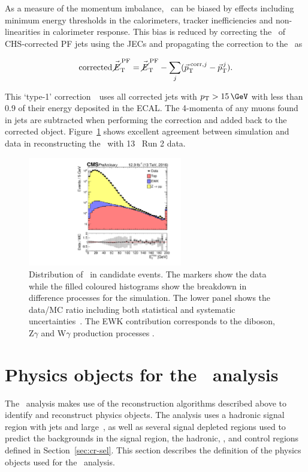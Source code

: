 As a measure of the momentum imbalance, \metvec~can be biased by effects including 
minimum energy thresholds in the calorimeters, tracker inefficiencies and non-linearities
in calorimeter response. This bias is reduced by correcting the \pt~of CHS-corrected PF jets 
using the JECs and propagating the correction to the \metvec~as

\begin{equation}
\text{corrected}\,\mbox{$\vec{\cancel{E}}^{\,\text{PF}}_{\rm T}$} = \mbox{$\vec{\cancel{E}}^{\,\text{PF}}_{\rm T}$} - \sum_{j}(\vec{p}^{\;\text{corr},j}_\text{T} -
\vec{p}_\text{T}^{\,j}).
\end{equation}

This `type-1' correction~\cite{met_fig}~uses all corrected jets with $\pt > 15\,\GeV$ with less than 0.9 of their energy deposited in the ECAL.
The 4-momenta of any muons found in jets are subtracted when performing the correction and added back to the corrected object.
Figure~\ref{fig:met_fig} shows excellent agreement between simulation and data
in reconstructing the \met~with 13 \TeV~Run 2 data.

\begin{figure}
\centering
    \includegraphics[width=0.6\textwidth]{./Figures/reconstruction/met_fig.pdf}
  \caption{Distribution of \met~in \zmumu candidate events. The markers show the data while the filled coloured histograms
  show the breakdown in difference processes for the simulation. The lower panel shows the data/MC ratio including
  both statistical and systematic uncertainties~\cite{met_fig}. The EWK contribution corresponds to the diboson, Z$\gamma$ 
  and W$\gamma$ production processes \label{fig:met_fig}.
}
\end{figure}

\section{Physics objects for the \alphat~analysis}

The \alphat~analysis makes use of the reconstruction algorithms described above
to identify and reconstruct physics objects. The analysis uses a hadronic signal 
region with jets and large~\met, as well as several signal depleted regions used to predict the
backgrounds in the signal region, the hadronic, \gj, \mj and \mmj control regions defined in 
Section~\ref{sec:cr-sel}. This section describes the definition of the 
physics objects used for the \alphat~analysis.

